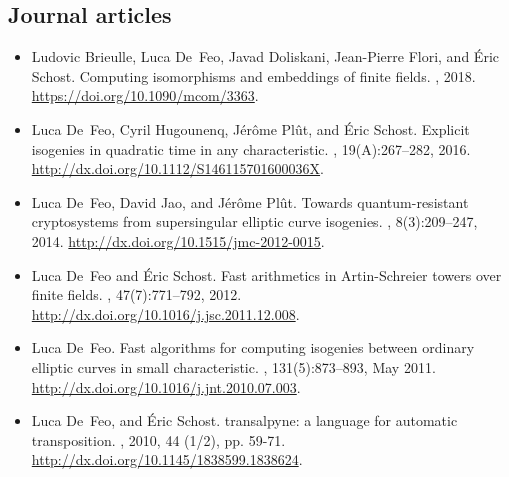 \documentclass{book}
\begin{document}
\subsection*{Journal articles}
\begin{itemize}
\item
Ludovic Brieulle, Luca De~Feo, Javad Doliskani, Jean-Pierre Flori, and {\'E}ric
  Schost.
\newblock Computing isomorphisms and embeddings of finite fields.
, 2018.
\newblock \url{https://doi.org/10.1090/mcom/3363}.

\item
Luca De~Feo, Cyril Hugounenq, J{\'e}r{\^o}me Pl{\^u}t, and {\'E}ric Schost.
\newblock Explicit isogenies in quadratic time in any characteristic.
, 19(A):267--282,
  2016.
  \newblock \url{http://dx.doi.org/10.1112/S146115701600036X}.
  
\item
Luca De~Feo, David Jao, and J{\'e}r{\^o}me Pl{\^u}t.
\newblock Towards quantum-resistant cryptosystems from supersingular elliptic
  curve isogenies.
, 8(3):209--247, 2014.
\newblock \url{http://dx.doi.org/10.1515/jmc-2012-0015}.

\item
Luca De~Feo and {\'E}ric Schost.
\newblock Fast arithmetics in {A}rtin-{S}chreier towers over finite fields.
, 47(7):771--792, 2012.
\newblock \url{http://dx.doi.org/10.1016/j.jsc.2011.12.008}.

\item
Luca De~Feo.
\newblock Fast algorithms for computing isogenies between ordinary elliptic
  curves in small characteristic.
, 131(5):873--893, May 2011.
\newblock \url{http://dx.doi.org/10.1016/j.jnt.2010.07.003}.

\item
  Luca De~Feo, and Éric Schost.
  \newblock transalpyne: a language for automatic transposition.
  , 2010, 44 (1/2), pp. 59-71.
  \newblock \url{http://dx.doi.org/10.1145/1838599.1838624}.
\end{itemize}
\end{document}
